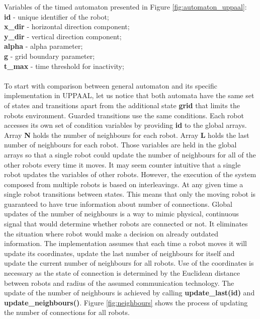 \noindent
Variables of the timed automaton presented in Figure \ref{fig:automaton_uppaal}:\\
\textbf{id} - unique identifier of the robot;\\
\textbf{x\_dir} - horizontal direction component;\\
\textbf{y\_dir} - vertical direction component;\\
\textbf{alpha} - alpha parameter;\\
\textbf{g} - grid boundary parameter;\\
\textbf{t\_max} - time threshold for inactivity;\\\\
\noindent
To start with comparison between general automaton and its specific implementation in UPPAAL, let us notice that both automata have the same set of states and transitions apart from the additional state \textbf{grid} that limits the robots environment. Guarded transitions use the same conditions. Each robot accesses its own set of condition variables by providing \textbf{id} to the global arrays. Array \textbf{N} holds the number of neighbours for each robot. Array \textbf{L} holds the last number of neighbours for each robot. Those variables are held in the global arrays so that a single robot could update the number of neighbours for all of the other robots every time it moves. It may seem counter intuitive that a single robot updates the variables of other robots. However, the execution of the system composed from multiple robots is based on interleavings. At any given time a single robot transitions between states. This means that only the moving robot is guaranteed to have true information about number of connections. Global updates of the number of neighbours is a way to mimic physical, continuous signal that would determine whether robots are connected or not. It eliminates the situation where robot would make a decision on already outdated information. The implementation assumes that each time a robot moves it will update its coordinates, update the last number of neighbours for itself and update the current number of neighbours for all robots. Use of the coordinates is necessary as the state of connection is determined by the Euclidean distance between robots and radius of the assumed communication technology. The update of the number of neighbours is achieved by calling \textbf{update\_last(id)} and \textbf{update\_neighbours()}. Figure \ref{fig:neighbours} shows the process of updating the number of connections for all robots.


